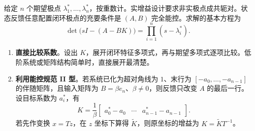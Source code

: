 给定 $n$ 个期望极点 $\lambda_1^\ast,\ldots,\lambda_n^\ast$，按重数计。实增益设计要求非实极点成共轭对。状态反馈任意配置闭环极点的充要条件是 $(A,B)$ 完全能控。求解的基本方程为
\[
  \det\bigl(sI-(A-BK)\bigr)
  =\prod_{i=1}^{n}(s-\lambda_i^\ast).
\]

\begin{enumerate}
    \item \textbf{直接比较系数}。设出 $K$，展开闭环特征多项式，再与期望多项式逐项比较。低阶系统或矩阵结构简单时，直接展开最清楚。
    \item \textbf{利用能控规范 II 型}。若系统已化为超对角线为 $1$、末行为 $[-a_0,\ldots,-a_{n-1}]$ 的伴随矩阵，且输入矩阵为 $B=\beta e_n$、$\beta\ne0$，则反馈只改变 $A$ 的最后一行。设目标系数为 $a_i^\ast$，有
    \[
        K=\frac{1}{\beta}
        \begin{bmatrix}a_0^\ast-a_0 & \cdots & a_{n-1}^\ast-a_{n-1}\end{bmatrix}.
    \]
    若先作变换 $x=Tz$，在 $z$ 坐标下算得 $\widetilde K$，则原坐标的增益为 $K=\widetilde K T^{-1}$。
\end{enumerate}



